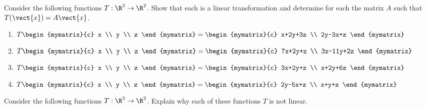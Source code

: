 \begin{enumialphparenastyle}
\begin{ex} Consider the following functions $T:\R^{3}\rightarrow \R^{2}$.
Show that each is a linear transformation and determine for each the matrix $A$ such that 
$T(\vect{x})=A\vect{x}$.

\begin{enumerate}
\item $T\begin{mymatrix}{c}
x \\
y \\
z
\end{mymatrix} =\begin{mymatrix}{c}
x+2y+3z \\
2y-3x+z
\end{mymatrix} $

\item $T\begin{mymatrix}{c}
x \\
y \\
z
\end{mymatrix} =\begin{mymatrix}{c}
7x+2y+z \\
3x-11y+2z
\end{mymatrix} $

\item $T\begin{mymatrix}{c}
x \\
y \\
z
\end{mymatrix} =\begin{mymatrix}{c}
3x+2y+z \\
x+2y+6z
\end{mymatrix} $

\item $T\begin{mymatrix}{c}
x \\
y \\
z
\end{mymatrix} =\begin{mymatrix}{c}
2y-5x+z \\
x+y+z
\end{mymatrix} $
\end{enumerate}
\end{ex}

\begin{ex} Consider the following functions $T:\R^{3}\rightarrow \R^{2}$.
Explain why each of these functions $T$ is not linear.


\end{ex}
\end{enumialphparenastyle}
